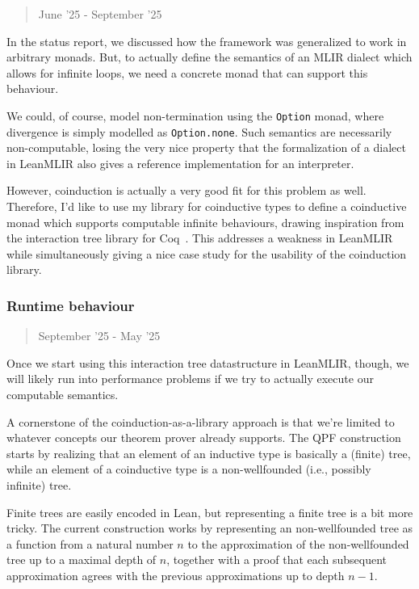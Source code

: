 \documentclass[a4paper]{scrartcl}
\begin{document}
\begin{quote}
June '25 - September  '25
\end{quote}

In the status report, we discussed how the framework was generalized to
work in arbitrary monads. But, to actually define the semantics of an
MLIR dialect which allows for infinite loops, we need a concrete monad
that can support this behaviour.

We could, of course, model non-termination using the \texttt{Option}
monad, where divergence is simply modelled as \texttt{Option.none}. Such
semantics are necessarily non-computable, losing the very nice property
that the formalization of a dialect in LeanMLIR also gives a reference
implementation for an interpreter.

However, coinduction is actually a very good fit for this problem as well.
Therefore, I'd like to use my library for coinductive types to define a
coinductive monad which supports computable infinite behaviours, drawing
inspiration from the interaction tree library for Coq~\cite{xiaInteractionTreesRepresenting2020}.
This addresses a
weakness in LeanMLIR while simultaneously giving a nice case study for
the usability of the coinduction library.

\subsubsection{Runtime behaviour}\label{runtime-behaviour}
\begin{quote}
September '25 - May '25
\end{quote}

Once we start using this interaction tree datastructure in LeanMLIR, though, 
we will likely run into performance problems if we try to actually execute our computable semantics.

A cornerstone of the coinduction-as-a-library approach is that we're
limited to whatever concepts our theorem prover already supports. The
QPF construction starts by realizing that an element of an inductive
type is basically a (finite) tree, while an element of a coinductive
type is a non-wellfounded (i.e., possibly infinite) tree.

Finite trees are easily encoded in Lean, but representing a finite tree
is a bit more tricky. The current construction works by representing an
non-wellfounded tree as a function from a natural number \(n\) to the
approximation of the non-wellfounded tree up to a maximal depth of
\(n\), together with a proof that each subsequent approximation agrees
with the previous approximations up to depth \(n-1\).
\end{document}
